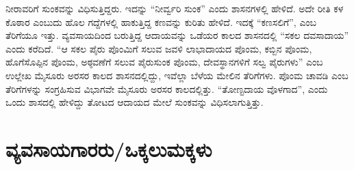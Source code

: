 ನೀರಾವರಿಗೆ ಸುಂಕವನ್ನು ವಿಧಿಸುತ್ತಿದ್ದರು. ಇದನ್ನು “ನೀರ್ವ್ವರಿ ಸುಂಕ” ಎಂದು ಶಾಸನಗಳಲ್ಲಿ ಹೇಳಿದೆ. ಅದೇ ರೀತಿ ಕಳ ಕೊಠಾರ ಎಂಬುದು ಹೊಲ ಗದ್ದೆಗಳಲ್ಲಿ ಹಾಕುತ್ತಿದ್ದ ಕಣವನ್ನು ಕುರಿತು ಹೇಳಿದೆ. ಇದಕ್ಕೆ “ಕಣಸಲಿಗೆ”, ಎಂಬ ತೆರಿಗೆಯೂ ಇತ್ತು. ವ್ಯವಸಾಯದಿಂದ ಬರುತ್ತಿದ್ದ ಆದಾಯವನ್ನು ಒಡೆಯರ ಕಾಲದ ಶಾಸನದಲ್ಲಿ “ಸಕಲ ದವಸಾದಾಯ” ಎಂದು ಕರೆದಿದೆ. “ಆ ಸಕಲ ಪೈರು ಪೊಂಮಿಗೆ ಸಲುವ ಜವಳಿ ಲಾಭಾದಾಯದ ಪೊಂಮ, ಕಬ್ಬಿನ ಪೊಂಮ, ಹೊಗೆಸೊಪ್ಪಿನ ಪೊಂಮ, ಅಠ್ಠವಣೆಗೆ ಸಲುವ ಪೈರುಸುಂಕ ಪೊಂಮ, ದೇವಸ್ಥಾನಗಳಿಗೆ ಸಲ್ವ ಪೈರುಗಳು” ಎಂಬ ಉಲ್ಲೇಖ ಮೈಸೂರು ಅರಸರ ಕಾಲದ ಶಾಸನದಲ್ಲಿದ್ದು, ಇವೆಲ್ಲಾ ಬೆಳೆಯ ಮೇಲಿನ ತೆರಿಗೆಗಳು. ಪೊಂಮ ಚಾವಡಿ ಎಂಬ ತೆರಿಗೆಗಳನ್ನು ಸಂಗ್ರಹಿಸುವ ವಿಭಾಗವೇ ಮೈಸೂರು ಅರಸರ ಕಾಲ\-ದಲ್ಲಿತ್ತು. “ತೋಣ್ಟದಾಯ ವೊಳಗಾದ”, ಎಂದು ಒಂದು ಶಾಸದಲ್ಲಿ ಹೇಳಿದ್ದು ತೋಟದ ಆದಾಯದ ಮೇಲೆ ಸುಂಕವನ್ನು ವಿಧಿಸಲಾಗುತ್ತಿತ್ತು.

\newpage

\section*{ವ್ಯವಸಾಯಗಾರರು/ಒಕ್ಕಲುಮಕ್ಕಳು}

